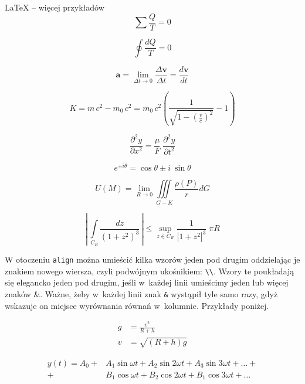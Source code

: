 \begin{easyappendix}{\LaTeX{} -- więcej przykładów}
\begin{equation*}
	\sum \frac{Q}{T} = 0
\end{equation*}

\begin{equation}
	\oint \frac{dQ}{T} = 0
\end{equation}

\begin{equation}
	\pmb{a} = \lim\limits_{\Delta t \to 0} \frac{\Delta \pmb{v}}{\Delta t} = \frac{d\pmb{v}}{dt}
\end{equation}

\begin{equation}
	K = m\,c^2 - m_0\,c^2 
	= m_0\,c^2 \left(
	\frac{1}{ \sqrt{1 - \left( \frac{v}{c} \right)^2 } } -1 
	\right)
\end{equation}

\begin{equation}
	\frac{\partial^2 y}{\partial x^2} = \frac{\mu}{F} \; \frac{\partial^2 y}{\partial t^2}
\end{equation}

\begin{equation}
	e^{\pm i\theta} = \cos \theta \pm i~\sin\theta
\end{equation}

\begin{equation}
	U(M) = \lim\limits_{R\to 0} \iiint\limits_{G-K}\frac{\rho(P)}{r}dG
\end{equation}

\begin{equation*}
	\left| \, \int\limits_{C_R} \frac{dz}{\left( 1+z^2 \right )^3} \, \right| \leqslant \sup\limits_{z \in C_R} \frac{1}{\left| 1+z^2 \right|^3} \; \pi R
\end{equation*}

W otoczeniu \texttt{align} można umieścić kilka wzorów jeden pod drugim oddzielając je znakiem nowego wiersza, czyli podwójnym ukośnikiem: \texttt{\textbackslash{}\textbackslash{}}. Wzory te poukładają się elegancko jeden pod drugim, jeśli w~każdej linii umieścimy jeden lub więcej znaków \&. Ważne, żeby w~każdej linii znak \texttt{\&} wystąpił tyle samo razy, gdyż wskazuje on miejsce wyrównania równań w~kolumnie. Przykłady poniżej.

\begin{align}
	g & = \frac{v^2}{R+h} \\
	v & = \sqrt{ \left( R+h \right) g }
\end{align}

\begin{align}
	y(t) = A_0 
	+& A_1 \sin \omega t + 
	A_2 \sin 2 \omega t + 
	A_3 \sin 3 \omega t + \ldots + \nonumber \\
	+& B_1 \cos \omega t + 
	B_2 \cos 2 \omega t + 
	B_1 \cos 3 \omega t + \ldots
\end{align}


\end{easyappendix}
